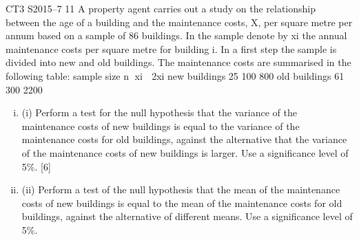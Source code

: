 \documentclass[a4paper,12pt]{article}
\begin{document}
\begin{enumerate}

CT3 S2015–7
11 A property agent carries out a study on the relationship between the age of a building and the maintenance costs, X, per square metre per annum based on a sample of 86 buildings. In the sample denote by xi the annual maintenance costs per square metre
for building i. In a first step the sample is divided into new and old buildings. The
maintenance costs are summarised in the following table:
  sample size n xi  2xi
new buildings 25 100 800
old buildings 61 300 2200
\begin{enumerate}[(i)]
\item (i) Perform a test for the null hypothesis that the variance of the maintenance costs of new buildings is equal to the variance of the maintenance costs for old buildings, against the alternative that the variance of the maintenance costs of new buildings is larger. Use a significance level of 5\%. [6]

\item (ii) Perform a test of the null hypothesis that the mean of the maintenance costs of new buildings is equal to the mean of the maintenance costs for old buildings, against the alternative of different means. Use a significance level of 5\%. 
\end{enumerate}


\end{enumerate}
\end{document}
